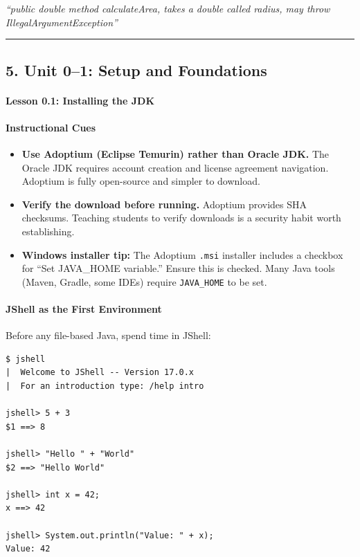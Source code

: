 \documentclass[
  justified,
  openright,
]{tufte-book}
\let\subsubsection\paragraph
\let\paragraph\paragraph
\let\subsubsection\paragraph
\let\paragraph\paragraph
\providecommand{\tightlist}{%
  \setlength{\itemsep}{0pt}\setlength{\parskip}{0pt}}
\begin{document}
\emph{``public double method calculateArea, takes a double called
radius, may throw IllegalArgumentException''}

\begin{center}\rule{0.5\linewidth}{0.5pt}\end{center}

\subsection{5. Unit 0--1: Setup and
Foundations}\label{unit-01-setup-and-foundations}

\subsubsection{Lesson 0.1: Installing the
JDK}\label{lesson-0.1-installing-the-jdk}

\paragraph{Instructional Cues}\label{instructional-cues}

\begin{itemize}
\tightlist
\item
  \textbf{Use Adoptium (Eclipse Temurin) rather than Oracle JDK.} The
  Oracle JDK requires account creation and license agreement navigation.
  Adoptium is fully open-source and simpler to download.
\item
  \textbf{Verify the download before running.} Adoptium provides SHA
  checksums. Teaching students to verify downloads is a security habit
  worth establishing.
\item
  \textbf{Windows installer tip:} The Adoptium \texttt{.msi} installer
  includes a checkbox for ``Set JAVA\_HOME variable.'' Ensure this is
  checked. Many Java tools (Maven, Gradle, some IDEs) require
  \texttt{JAVA\_HOME} to be set.
\end{itemize}

\paragraph{JShell as the First
Environment}\label{jshell-as-the-first-environment}

Before any file-based Java, spend time in JShell:

\begin{verbatim}
$ jshell
|  Welcome to JShell -- Version 17.0.x
|  For an introduction type: /help intro

jshell> 5 + 3
$1 ==> 8

jshell> "Hello " + "World"
$2 ==> "Hello World"

jshell> int x = 42;
x ==> 42

jshell> System.out.println("Value: " + x);
Value: 42
\end{verbatim}
\end{document}
